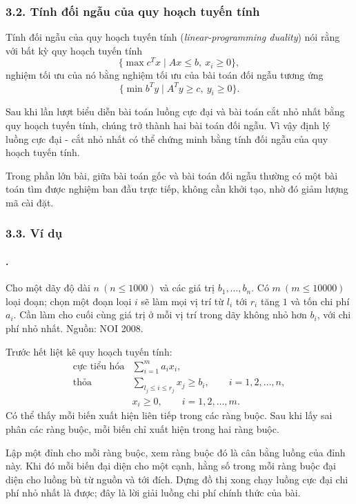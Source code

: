 \documentclass[11pt]{article}
\begin{document}
\subsubsection*{3.2. Tính đối ngẫu của quy hoạch tuyến tính}

Tính đối ngẫu của quy hoạch tuyến tính (\emph{linear-programming duality}) nói
rằng với bất kỳ quy hoạch tuyến tính
\[
  \{\max c^Tx\mid Ax\le b,\ x_i\ge 0\},
\]
nghiệm tối ưu của nó bằng nghiệm tối ưu của bài toán đối ngẫu tương ứng
\[
  \{\min b^Ty\mid A^Ty\ge c,\ y_i\ge 0\}.
\]

Sau khi lần lượt biểu diễn bài toán luồng cực đại và bài toán cắt nhỏ nhất
bằng quy hoạch tuyến tính, chúng trở thành hai bài toán đối ngẫu. Vì vậy định
lý luồng cực đại - cắt nhỏ nhất có thể chứng minh bằng tính đối ngẫu của quy
hoạch tuyến tính.

Trong phần lớn bài, giữa bài toán gốc và bài toán đối ngẫu thường có một bài
toán tìm được nghiệm ban đầu trực tiếp, không cần khởi tạo, nhờ đó giảm lượng
mã cài đặt.

\subsubsection*{3.3. Ví dụ}

\paragraph{.}
Cho một dãy độ dài \(n\ (n\le 1000)\) và các giá trị \(b_1,\ldots,b_n\). Có
\(m\ (m\le 10000)\) loại đoạn; chọn một đoạn loại \(i\) sẽ làm mọi vị trí từ
\(l_i\) tới \(r_i\) tăng \(1\) và tốn chi phí \(a_i\). Cần làm cho cuối cùng
giá trị ở mỗi vị trí trong dãy không nhỏ hơn \(b_i\), với chi phí nhỏ nhất.
Nguồn: NOI 2008.

Trước hết liệt kê quy hoạch tuyến tính:
\[
\begin{array}{ll}
\text{cực tiểu hóa} & \displaystyle \sum_{i=1}^{m}a_ix_i,\\[0.4em]
\text{thỏa} & \displaystyle \sum_{l_j\le i\le r_j}x_j\ge b_i,
  \qquad i=1,2,\ldots,n,\\[0.4em]
& x_i\ge 0,\qquad i=1,2,\ldots,m.
\end{array}
\]
Có thể thấy mỗi biến xuất hiện liên tiếp trong các ràng buộc. Sau khi lấy sai
phân các ràng buộc, mỗi biến chỉ xuất hiện trong hai ràng buộc.

Lập một đỉnh cho mỗi ràng buộc, xem ràng buộc đó là cân bằng luồng của đỉnh
này. Khi đó mỗi biến đại diện cho một cạnh, hằng số trong mỗi ràng buộc đại
diện cho luồng bù từ nguồn và tới đích. Dựng đồ thị xong chạy luồng cực đại
chi phí nhỏ nhất là được; đây là lời giải luồng chi phí chính thức của bài.
\end{document}

